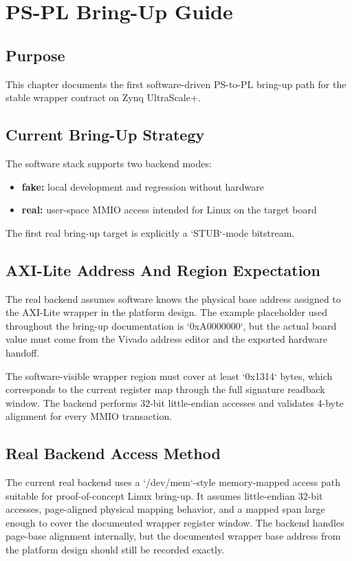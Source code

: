 \chapter{PS-PL Bring-Up Guide}

\section*{Purpose}
This chapter documents the first software-driven PS-to-PL bring-up path for the stable wrapper contract on Zynq UltraScale+.

\section{Current Bring-Up Strategy}
The software stack supports two backend modes:
\begin{itemize}[leftmargin=*]
  \item \textbf{fake:} local development and regression without hardware
  \item \textbf{real:} user-space MMIO access intended for Linux on the target board
\end{itemize}

The first real bring-up target is explicitly a `STUB`-mode bitstream.

\section{AXI-Lite Address And Region Expectation}
The real backend assumes software knows the physical base address assigned to the AXI-Lite wrapper in the platform design. The example placeholder used throughout the bring-up documentation is `0xA0000000`, but the actual board value must come from the Vivado address editor and the exported hardware handoff.

The software-visible wrapper region must cover at least `0x1314` bytes, which corresponds to the current register map through the full signature readback window. The backend performs 32-bit little-endian accesses and validates 4-byte alignment for every MMIO transaction.

\section{Real Backend Access Method}
The current real backend uses a `/dev/mem`-style memory-mapped access path suitable for proof-of-concept Linux bring-up. It assumes little-endian 32-bit accesses, page-aligned physical mapping behavior, and a mapped span large enough to cover the documented wrapper register window. The backend handles page-base alignment internally, but the documented wrapper base address from the platform design should still be recorded exactly.

